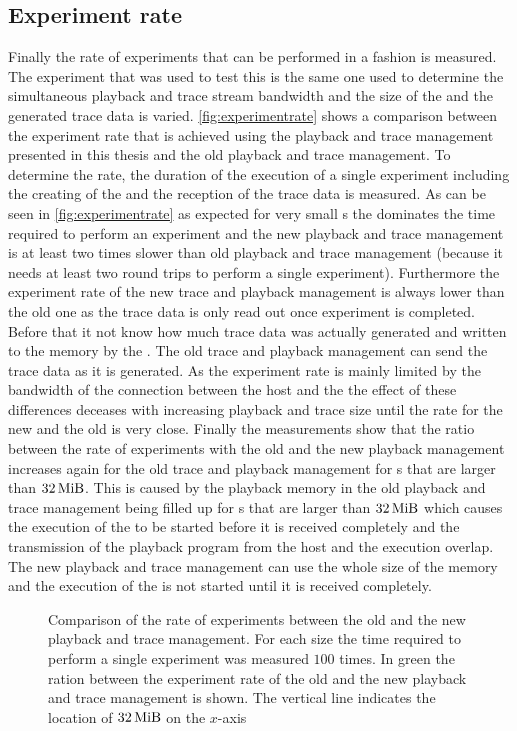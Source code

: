 \subsection{Experiment rate}
Finally the rate of experiments that can be performed in a \HWinTheLoop{} fashion is measured. The experiment that was used to test this is the same one used to determine the simultaneous playback and trace stream bandwidth and the size of the \PlaybackProgram{} and the generated trace data is varied. \autoref{fig:experimentrate} shows a comparison between the experiment rate that is achieved using the playback and trace management presented in this thesis and the old playback and trace management. To determine the rate, the duration of the execution of a single experiment including the creating of the \PlaybackProgram{} and the reception of the trace data is measured. As can be seen in \autoref{fig:experimentrate} as expected for very small \PlaybackProgram{}s the \rtt{} dominates the time required to perform an experiment and the new playback and trace management is at least two times slower than old playback and trace management (because it needs at least two round trips to perform a single experiment). Furthermore the experiment rate of the new trace and playback management is always lower than the old one as the trace data is only read out once experiment is completed. Before that it not know how much trace data was actually generated and written to the \DDR{} memory by the \AXIDMA{}. The old trace and playback management can send the trace data as it is generated. As the experiment rate is mainly limited by the bandwidth of the connection between the host and the \FPGA{} the effect of these differences deceases with increasing playback and trace size until the rate for the new and the old is very close.
Finally the measurements show that the ratio between the rate of experiments with the old and the new playback management increases again for the old trace and playback management for \PlaybackProgram{}s that are larger than $\SI{32}{\mebi\byte}$. This is caused by the playback memory in the old playback and trace management being filled up for \PlaybackProgram{}s that are larger than $\SI{32}{\mebi\byte}$ which causes the execution of the \PlaybackProgram{} to be started before it is received completely and the transmission of the playback program from the host and the execution overlap. The new playback and trace management can use the whole size of the \DDR{} memory and the execution of the \PlaybackProgram{} is not started until it is received completely.
\begin{figure}
\caption{Comparison of the rate of experiments between the old and the new playback and trace management. For each size the time required to perform a single experiment was measured $\num{100}$ times. In green the ration between the experiment rate of the old and the new playback and trace management is shown. The vertical line indicates the location of $\SI{32}{\mebi\byte}$ on the $x$-axis}\label{fig:experimentrate}
\end{figure}

